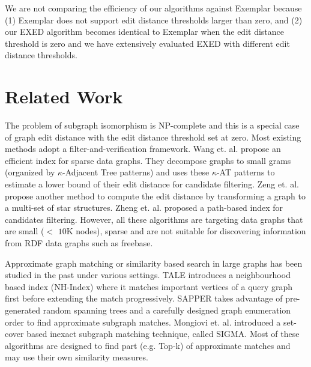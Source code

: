 \documentclass{sigmod}
\begin{document}
We are not comparing the efficiency of our algorithms against Exemplar because (1) Exemplar does not support edit distance thresholds larger than zero, and (2) our EXED algorithm becomes identical to Exemplar when the edit distance threshold is zero and we have extensively evaluated EXED with different edit distance thresholds.

\section{Related Work}

The problem of subgraph isomorphism is NP-complete and this is a special case of graph edit distance with the edit distance threshold set at zero. Most existing methods adopt a filter-and-verification framework. Wang et. al.\cite{wang2012efficiently} propose  an efficient index for sparse data graphs. They decompose graphs to small grams (organized by $\kappa$-Adjacent Tree patterns) and uses these $\kappa$-AT patterns to estimate a lower bound of their edit distance for candidate filtering. Zeng et. al. \cite{zeng2009comparing} propose another method to compute the edit distance by transforming a graph to a multi-set of star structures. Zheng et. al.\cite{zeng2009comparing} proposed a path-based index for candidates filtering. However, all these algorithms are targeting  data graphs that are small ($<$ $10$K nodes), sparse and are not suitable for discovering information from RDF data graphs such as freebase.
 
Approximate graph matching or similarity based search in large graphs has been studied in the past under various settings. TALE\cite{tian2008tale} introduces a neighbourhood based index (NH-Index) where it matches important vertices of a query graph first before extending the match progressively. SAPPER\cite{zhang2010sapper} takes advantage of pre-generated random spanning trees and a carefully designed graph enumeration order to find approximate subgraph matches.  Mongiovi et. al.\cite{mongiovi2010sigma} introduced a set-cover based inexact subgraph matching technique, called SIGMA. Most of these algorithms are designed to find part (e.g. Top-k) of approximate matches and may use their own similarity measures. 
\end{document}
